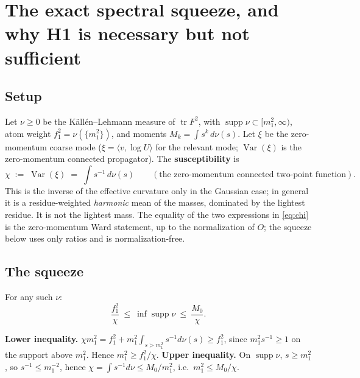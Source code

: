 \section{The exact spectral squeeze, and why H1 is necessary but not sufficient}
\label{sec:squeeze}

\subsection{Setup}

Let $\nu\ge0$ be the Källén--Lehmann measure of $\operatorname{tr}F^2$, with
$\operatorname{supp}\nu\subset[m_1^2,\infty)$, atom weight $f_1^2=\nu(\{m_1^2\})$, and moments
$M_k=\int s^k\,d\nu(s)$. Let $\xi$ be the zero-momentum coarse mode
($\xi=\langle v,\log U\rangle$ for the relevant mode; $\operatorname{Var}(\xi)$ is the
zero-momentum connected propagator). The \textbf{susceptibility} is
\begin{equation}
\chi \;:=\; \operatorname{Var}(\xi) \;=\; \int s^{-1}\,d\nu(s)
\qquad(\text{the zero-momentum connected two-point function}).
\label{eq:chi}
\end{equation}
This is the inverse of the effective curvature only in the Gaussian case; in general it is a
residue-weighted \emph{harmonic} mean of the masses, dominated by the lightest residue. It is
not the lightest mass. The equality of the two expressions in \eqref{eq:chi} is the
zero-momentum Ward statement, up to the normalization of $O$; the squeeze below uses only ratios
and is normalization-free.

\subsection{The squeeze \LT}

For any such $\nu$:
\begin{equation}
\frac{f_1^2}{\chi}\ \le\ \inf\operatorname{supp}\nu\ \le\ \frac{M_0}{\chi}.
\label{eq:squeeze}
\end{equation}
\begin{proofx}
\textbf{Lower inequality.} $\chi m_1^2=f_1^2+m_1^2\int_{s>m_1^2}s^{-1}d\nu(s)\ge f_1^2$, since
$m_1^2s^{-1}\ge1$ on the support above $m_1^2$. Hence $m_1^2\ge f_1^2/\chi$.
\textbf{Upper inequality.} On $\operatorname{supp}\nu$, $s\ge m_1^2$, so $s^{-1}\le m_1^{-2}$,
hence $\chi=\int s^{-1}d\nu\le M_0/m_1^2$, i.e.\ $m_1^2\le M_0/\chi$.
\end{proofx}

